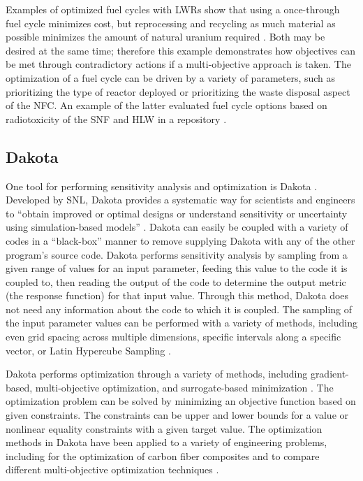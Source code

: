 Examples of optimized fuel cycles with \glspl{LWR} show that using a
once-through fuel cycle minimizes cost, but reprocessing and recycling as 
much material as possible minimizes the amount of natural uranium 
required \cite{kunsch_nuclear_1987}. Both may 
be desired at the same time; therefore this example demonstrates how 
objectives can be met through contradictory actions if a multi-objective 
approach is taken. The optimization of a fuel cycle can be driven 
by a variety of parameters, such as prioritizing the type of reactor 
deployed or prioritizing the waste disposal 
aspect of the \gls{NFC}. An example of the latter 
evaluated fuel cycle options based on radiotoxicity of the \gls{SNF} and 
\gls{HLW} in a repository \cite{del_cul_advanced_2010}. 

\subsection{Dakota}
One tool for performing sensitivity analysis and optimization is 
Dakota \cite{adams_dakota_2021}. Developed by \gls{SNL}, Dakota provides 
a systematic way for scientists and 
engineers to ``obtain improved or optimal designs or understand sensitivity
or uncertainty using simulation-based models'' \cite{adams_dakota_2021}.
Dakota can easily be coupled with a variety of codes in a ``black-box'' 
manner
to remove supplying Dakota with any of the other program's source code.
Dakota performs sensitivity analysis by sampling from a given range of 
values for an input parameter, feeding this value to the code it is 
coupled to, then reading the output of the code to determine the output 
metric (the response function) for that input value. Through this method, 
Dakota does not need any information about the code to which it is coupled. 
The sampling of the input parameter values can be performed with a variety of 
methods, including even grid spacing across multiple dimensions, specific 
intervals along a specific vector, or Latin Hypercube Sampling 
\cite{adams_dakota_2021}.

Dakota performs optimization through a variety of methods, including
gradient-based, multi-objective optimization, and surrogate-based 
minimization \cite{adams_dakota_2021}. The optimization problem can be 
solved by minimizing an objective function based on given constraints. The 
constraints can be upper and lower bounds for a value or nonlinear 
equality constraints with a given target value. The optimization 
methods in Dakota have been applied to a variety of engineering problems,
including for the optimization of carbon fiber composites 
\cite{skulborstad_multi-objective_2018} and to compare different 
multi-objective optimization techniques \cite{chiandussi_comparison_2012}. 

